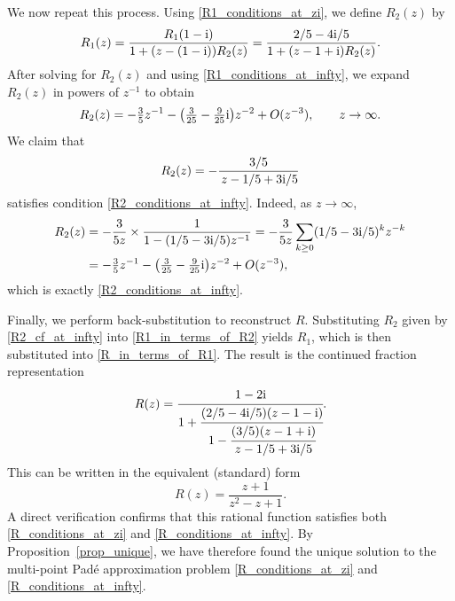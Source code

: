 \documentclass[12pt]{article}
\def\i{{\textnormal i}}
\begin{document}
We now repeat this process. Using \eqref{R1_conditions_at_zi}, we define $R_2(z)$ by
\begin{equation}\label{R1_in_terms_of_R2}
R_1(z)=\frac{R_1(1-\i)}{1+(z-(1-\i)) R_2(z)}=\frac{2/5-4\i/5}{1+(z-1+\i) R_2(z)}.
\end{equation}
After solving for $R_2(z)$ and using \eqref{R1_conditions_at_infty}, we expand $R_2(z)$ in powers of $z^{-1}$ to obtain
\begin{equation}\label{R2_conditions_at_infty}
R_2(z)=-\tfrac{3}{5} z^{-1}-\big(\tfrac{3}{25}-\tfrac{9}{25}\i\big) z^{-2} + O(z^{-3}), \qquad z\to \infty. 
\end{equation} 
We claim that
\begin{equation}\label{R2_cf_at_infty}
R_2(z)=-\frac{3/5}{\,z-1/5+3\i/5}  
\end{equation}
satisfies condition \eqref{R2_conditions_at_infty}. Indeed, as $z\to \infty$,
\begin{align*}
R_2(z)&=-\frac{3}{5z}\times\frac{1}{1-(1/5-3\i/5)z^{-1}}
=-\frac{3}{5z}\sum_{k\ge 0}(1/5-3\i/5)^k z^{-k}\\
&=-\tfrac{3}{5} z^{-1}-\big(\tfrac{3}{25}-\tfrac{9}{25}\i\big) z^{-2} + O(z^{-3}),  
\end{align*}
which is exactly \eqref{R2_conditions_at_infty}.  

Finally, we perform back-substitution to reconstruct $R$. Substituting $R_2$ given by \eqref{R2_cf_at_infty} into \eqref{R1_in_terms_of_R2} yields $R_1$, which is then substituted into \eqref{R_in_terms_of_R1}. The result is the continued fraction representation
\begin{align*}
R(z)=\cfrac{1-2\i}{1+\cfrac{(2/5-4\i/5)(z-1-\i)}{1-\cfrac{(3/5)(z-1+\i)}{z-1/5+3\i/5}}}.
\end{align*}
This can be written in the equivalent (standard) form 
\[
R(z)=\frac{z+1}{z^2-z+1}.
\]
A direct verification  confirms that this rational function satisfies both \eqref{R_conditions_at_zi} and \eqref{R_conditions_at_infty}. By Proposition~\ref{prop_unique}, we have therefore found the unique solution to the multi-point Pad\'e approximation problem \eqref{R_conditions_at_zi} and \eqref{R_conditions_at_infty}.
\end{document}
